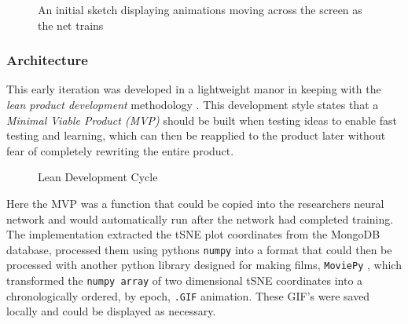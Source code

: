 \documentclass[a4paper,11pt,titlepage]{article}
\begin{document}
	\begin{figure}[H]
    			\caption{An initial sketch displaying animations moving across the screen as the net trains}%
	\end{figure}		
	
	\subsubsection{Architecture}
	This early iteration was developed in a lightweight manor in keeping with the \textit{lean product development} methodology \cite{}. This development style states that a \textit{Minimal Viable Product (MVP)} should be built when testing ideas to enable fast testing and learning, which can then be reapplied to the product later without fear of completely rewriting the entire product.
	\par 
		
	\begin{figure}[H]
    			\caption{Lean Development Cycle}%
	\end{figure}	
	
	Here the MVP was a function that could be copied into the researchers neural network and would automatically run after the network had completed training. The implementation extracted the tSNE plot coordinates from the MongoDB database, processed them using pythons \texttt{numpy} into a format that could then be processed with another python library designed for making films, \texttt{MoviePy} \cite{}, which transformed the \texttt{numpy array} of two dimensional tSNE coordinates into a chronologically ordered, by epoch, \texttt{.GIF} animation. These GIF's were saved locally and could be displayed as necessary.
	
\end{document}
